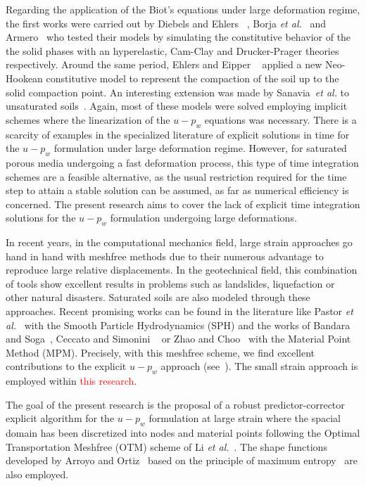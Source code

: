 \documentclass[twocolumn]{svjour3}          %
\begin{document}
Regarding the application of the Biot's equations under large deformation regime, the first works were  carried out by Diebels and Ehlers ~\cite{DiebelsE:96}, Borja \textit{et al.}~\cite{borja95,borja98} and Armero~\cite{Armero99} who tested their models by simulating the constitutive behavior of the the solid phases with an hyperelastic, Cam-Clay and Drucker-Prager theories respectively.  Around the same period, Ehlers and Eipper ~\cite{Ehlers:99} applied a new Neo-Hookean constitutive model to represent the compaction of the soil up to the solid compaction point. An interesting extension was made by Sanavia~\textit{et al.} to unsaturated soils~\cite{Sanavia:01,Sanavia:02b,Sanavia:02}. Again, most of these models were solved employing implicit schemes where the linearization of the $u-p_w$ equations was necessary. There is a scarcity of examples in the specialized literature of explicit solutions in time for the $u-p_w$ formulation under large deformation regime. However, for saturated porous media undergoing a fast deformation process, this type of time integration schemes are a feasible alternative, as the usual restriction required for the time step to attain a stable solution can be assumed, as far as numerical efficiency is concerned. The present research aims to cover the lack of explicit time integration solutions for the $u-p_w$ formulation undergoing large deformations.


In recent years, in the computational mechanics field, large strain approaches go hand in hand with meshfree methods due to their numerous advantage to reproduce large relative displacements. In the geotechnical field, this combination of tools show excellent results in problems such as landslides, liquefaction or other natural disasters. Saturated soils are also modeled through these approaches. Recent promising works can be found in the literature like Pastor {\it et al.}~\cite{Pastor2021} with the Smooth Particle Hydrodynamics (SPH) and the works of Bandara and Soga~\cite{Bandara2016a}, Ceccato and Simonini ~\cite{Ceccato:16} or Zhao and Choo~\cite{Choo2020} with the Material Point Method (MPM). Precisely, with this meshfree scheme, we find excellent contributions to the explicit $u-p_w$ approach (see~\cite{Zhang2009,Zheng2013}). The small strain approach is employed within \textcolor{red}{this research}.

The goal of the present research is the proposal of a robust predictor-corrector explicit algorithm for the $u-p_w$ formulation at large strain where the  spacial domain has been discretized into nodes and material points following the Optimal Transportation Meshfree (OTM) scheme of Li {\it et al.}~\cite{li2010}. The shape functions developed by Arroyo and Ortiz~\cite{arroyo2006} based on the principle of maximum entropy~\cite{Sukumar2004} are also employed. 
\end{document}
